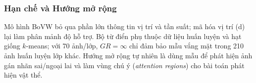 \subsubsection{Hạn chế và Hướng mở rộng}
Mô hình BoVW bỏ qua phần lớn thông tin vị trí và tần suất; mã hóa vị trí (d) lại làm phân mảnh độ hỗ trợ. Bộ từ điển phụ thuộc dữ liệu huấn luyện và hạt giống $k$-means; với 70 ảnh/lớp, $GR = \infty$ chỉ đảm bảo mẫu vắng mặt trong 210 ảnh huấn luyện lớp khác. Hướng mở rộng tự nhiên là dùng mẫu để phát hiện ảnh gán nhãn sai/ngoại lai và làm vùng chú ý (\emph{attention regions}) cho bài toán phát hiện vật thể.

